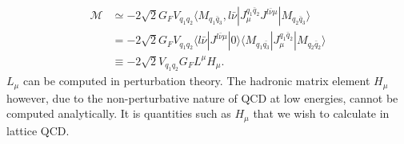 \begin{align}
  \nonumber
  \mathcal{M} & \simeq -2\sqrt{2} G_F V_{q_1q_2} \langle M_{q_1\bar{q}_3}, l\bar{\nu} | J_{\mu}^{q_1\bar{q}_2} J^{l\bar{\nu} \mu} | M_{q_2\bar{q}_3} \rangle \\
  \nonumber
  & = -2\sqrt{2} G_F V_{q_1q_2} \langle l\bar{\nu} | J^{l\bar{\nu} \mu} | 0 \rangle \langle M_{q_1\bar{q_3}} | J_{\mu}^{q_1\bar{q}_2} | M_{q_2\bar{q}_2} \rangle \\
  & \equiv -2\sqrt{2} V_{q_1q_2} G_F L^{\mu} H_{\mu}.
  \label{eq:LH}
\end{align}
$L_{\mu}$ can be computed in perturbation theory. The hadronic matrix element $H_{\mu}$ however, due to the non-perturbative nature of QCD at low energies,
cannot be computed analytically. It is quantities such as $H_{\mu}$ that we wish to calculate in lattice QCD.


